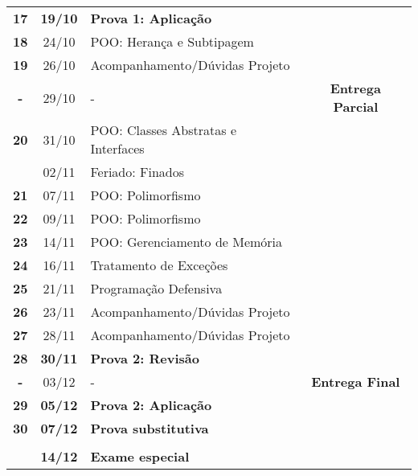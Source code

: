 \documentclass[11pt]{article}
\begin{document}
\begin{center}
\begin{tabular}{>{\bfseries}ccl>{\bfseries}c}
\rowcolor{yellow!50} 17 & \textbf{19/10} & \textbf{Prova 1: Aplicação} & \\[0pt]
18 & 24/10 & POO: Herança e Subtipagem & \\[0pt]
19 & 26/10 & Acompanhamento/Dúvidas Projeto & \\[0pt]
- & 29/10 & - & Entrega Parcial\\[0pt]
20 & 31/10 & POO: Classes Abstratas e Interfaces & \\[0pt]
\rowcolor{green!40} & 02/11 & Feriado: Finados & \\[0pt]
21 & 07/11 & POO: Polimorfismo & \\[0pt]
22 & 09/11 & POO: Polimorfismo & \\[0pt]
23 & 14/11 & POO: Gerenciamento de Memória & \\[0pt]
24 & 16/11 & Tratamento de Exceções & \\[0pt]
25 & 21/11 & Programação Defensiva & \\[0pt]
26 & 23/11 & Acompanhamento/Dúvidas Projeto & \\[0pt]
27 & 28/11 & Acompanhamento/Dúvidas Projeto & \\[0pt]
\rowcolor{yellow!50} 28 & \textbf{30/11} & \textbf{Prova 2: Revisão} & \\[0pt]
- & 03/12 & - & Entrega Final\\[0pt]
\rowcolor{yellow!50} 29 & \textbf{05/12} & \textbf{Prova 2: Aplicação} & \\[0pt]
\rowcolor{yellow!50} 30 & \textbf{07/12} & \textbf{Prova substitutiva} & \\[0pt]
 &  &  & \\[0pt]
\rowcolor{yellow!50} & \textbf{14/12} & \textbf{Exame especial} & \\[0pt]
\bottomrule
\end{tabular}
\end{center}
\end{document}
